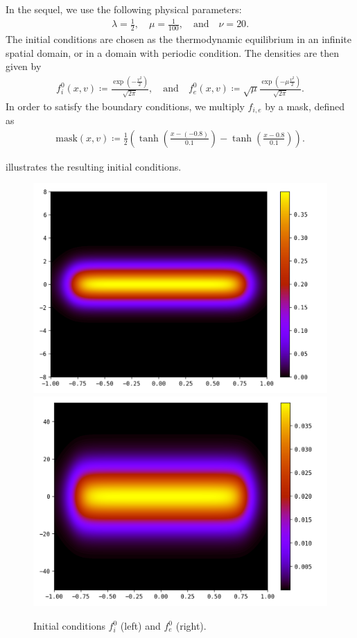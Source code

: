 \documentclass{article}
\numberwithin{equation}{section}
\newcommand{\imh}{\textwidth} %
\begin{document}
In the sequel, we use the following physical parameters:
\begin{align}\label{eq:param_simu}
	\lambda = \frac{1}{2}, \quad \mu = \frac{1}{100}, \quad\text{and}\quad \nu = 20.
\end{align}
The initial conditions are chosen as the thermodynamic equilibrium in an infinite spatial domain, or in a domain with periodic condition. The densities are then given by
\begin{align*}
	f_{i}^0 (x,v) \coloneqq \frac{\exp\left(- \frac{v^2}{2}\right)}{\sqrt{2\pi}}, \quad \text{and} \quad f_{e}^0 (x,v) \coloneqq \sqrt{\mu}\frac{\exp\left(- \mu \frac{v^2}{2}\right)}{\sqrt{2\pi}}.
\end{align*}
In order to satisfy the boundary conditions, we multiply $f_{i,e}$ by a mask, defined as
\begin{align*}
	\text{mask}(x,v) \coloneqq \frac{1}{2} \left(\tanh\left(\frac{x - (-0.8)}{0.1}\right) - \tanh\left(\frac{x - 0.8}{0.1}\right)\right).
\end{align*}

 illustrates the resulting initial conditions.
\begin{figure}
	\centering
	\renewcommand{\imh}{0.33\linewidth}
	\includegraphics[height=\imh]{images/fi_init}
	\includegraphics[height=\imh]{images/fe_init}
	\caption{Initial conditions $f_i^0$ (left) and $f_e^0$ (right).}
	\label{fig:init_cond}
\end{figure}
\end{document}
